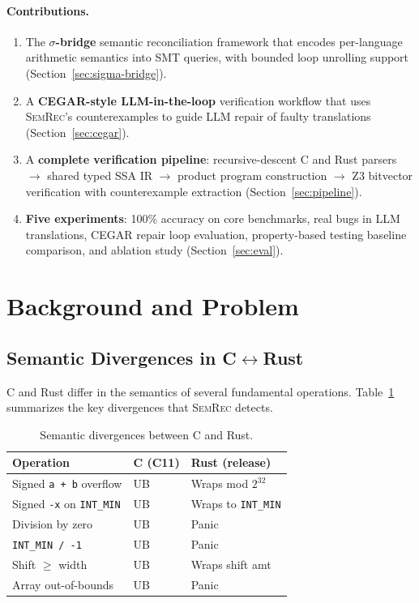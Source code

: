\documentclass[11pt,a4paper]{article}
\begin{document}
\paragraph{Contributions.}
\begin{enumerate}[leftmargin=*]
  \item The \textbf{$\sigma$-bridge} semantic reconciliation framework that
    encodes per-language arithmetic semantics into SMT queries, with bounded
    loop unrolling support (Section~\ref{sec:sigma-bridge}).
  \item A \textbf{CEGAR-style LLM-in-the-loop} verification workflow that
    uses \textsc{SemRec}'s counterexamples to guide LLM repair of faulty
    translations (Section~\ref{sec:cegar}).
  \item A \textbf{complete verification pipeline}: recursive-descent C and
    Rust parsers $\to$ shared typed SSA IR $\to$ product program construction
    $\to$ Z3 bitvector verification with counterexample extraction
    (Section~\ref{sec:pipeline}).
  \item \textbf{Five experiments}: 100\% accuracy on core benchmarks,
    real bugs in LLM translations, CEGAR repair loop evaluation,
    property-based testing baseline comparison, and ablation study
    (Section~\ref{sec:eval}).
\end{enumerate}


\section{Background and Problem}\label{sec:background}

\subsection{Semantic Divergences in C$\leftrightarrow$Rust}

C and Rust differ in the semantics of several fundamental operations.
Table~\ref{tab:divergences} summarizes the key divergences that
\textsc{SemRec} detects.

\begin{table}[t]
\centering
\small
\caption{Semantic divergences between C and Rust.}
\label{tab:divergences}
\begin{tabular}{@{}lll@{}}
\toprule
Operation & C (C11) & Rust (release) \\
\midrule
Signed \texttt{a + b} overflow & UB & Wraps mod $2^{32}$ \\
Signed \texttt{-x} on \texttt{INT\_MIN} & UB & Wraps to \texttt{INT\_MIN} \\
Division by zero & UB & Panic \\
\texttt{INT\_MIN / -1} & UB & Panic \\
Shift $\geq$ width & UB & Wraps shift amt \\
Array out-of-bounds & UB & Panic \\
\bottomrule
\end{tabular}
\end{table}
\end{document}
